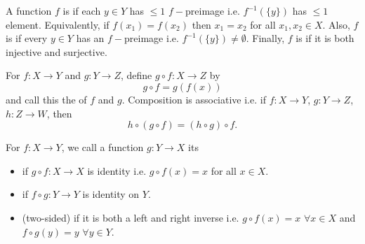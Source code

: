 \documentclass[14pt,oneside]{extarticle}
\begin{document}
\begin{definition*}
  A function $f$ is  if each $y \in Y$ has $\leq 1$ $f-$preimage i.e. $f^{-1}(\{y\})$ has $\leq 1$ element. Equivalently, if $f(x_1) = f(x_2)$ then $x_1 = x_2$ for all $x_1, x_2 \in X$. Also, $f$ is  if every $y \in Y$ has an $f-$preimage i.e. $f^{-1}(\{y\}) \neq \emptyset$. Finally, $f$ is  if it is both injective and surjective.
\end{definition*}

\begin{definition*}
  For $f: X \to Y$ and $g:Y \to Z$, define $g \circ f: X \to Z$ by 
  \[g \circ f = g(f(x)) \]
  and call this the  of $f$ and $g$.
  Composition is associative i.e. if $f: X \to Y$, $g:Y \to Z$, $h:Z \to W$, then 
  \[h \circ (g \circ f) = (h \circ g) \circ f.\]
\end{definition*}
\begin{definition*}
  For $f: X \to Y$, we call a function $g: Y \to X$ its
  \begin{itemize}[label=$\rightarrow$, nosep]
    \item {} if $g \circ f: X \to X$ is identity i.e. $g \circ f(x) = x$ for all $x \in X$.
    \item {} if $f \circ g: Y \to Y$ is identity on $Y$.
    \item {} (two-sided) if it is both a left and right inverse i.e. $g \circ f (x) = x$ $\forall x \in X$ and $f \circ g (y) = y$ $\forall y \in Y$.
  \end{itemize}
\end{definition*}

\end{document}

